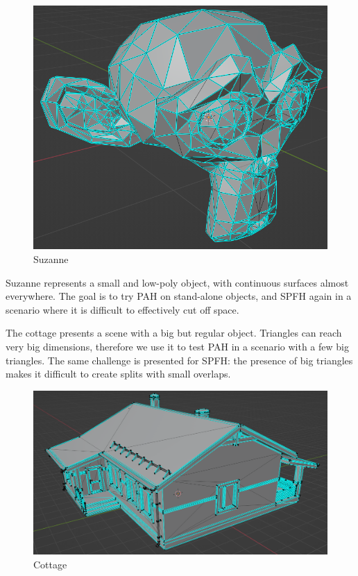 \documentclass{PoliMi_MasterThesis}
\begin{document}
\begin{minipage}{0.4\textwidth}
	\begin{figure}[H]
		\includegraphics[width=\textwidth]{Images/suzanne_scene.png}
		\caption{Suzanne}
		\label{fig:suzanne}
	\end{figure}
\end{minipage} \hfill
\begin{minipage}{0.55\textwidth}
	Suzanne represents a small and low-poly object, with continuous surfaces almost everywhere. The goal is to try PAH on stand-alone objects, and SPFH again in a scenario where it is difficult to effectively cut off space.
\end{minipage}

\begin{minipage}{0.55\textwidth}
	The cottage presents a scene with a big but regular object. Triangles can reach very big dimensions, therefore we use it to test PAH in a scenario with a few big triangles. The same challenge is presented for SPFH: the presence of big triangles makes it difficult to create splits with small overlaps.
\end{minipage}
\hfill \begin{minipage}{0.4\textwidth}
	\begin{figure}[H]
		\includegraphics[width=\textwidth]{Images/cottage_scene.png}
		\caption{Cottage}
		\label{fig:cottage}
	\end{figure}
\end{minipage} 
\end{document}
